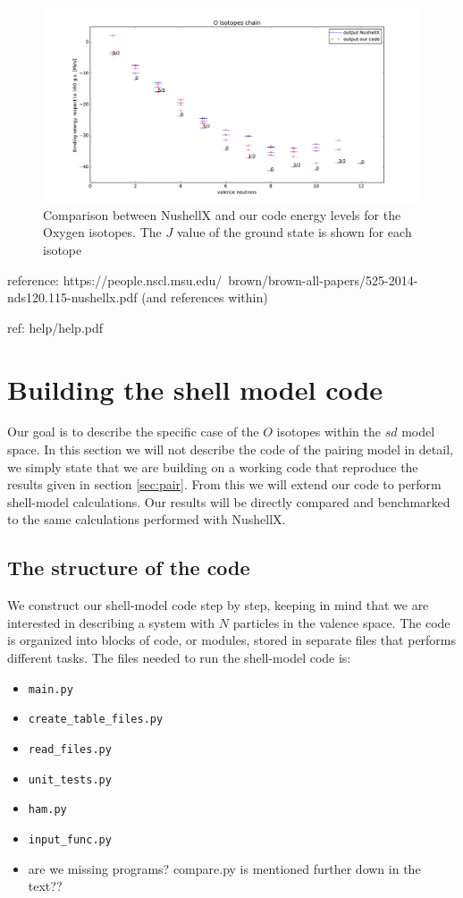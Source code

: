 \documentclass[twoside]{article}
\begin{document}
\begin{figure}[ht]
\centering
\includegraphics[width=1.\textwidth]{isotopes.pdf}
\caption{Comparison between NushellX and our code energy levels for the Oxygen isotopes. The $J$ value of the ground state is shown for each isotope}
\label{fig: isotopes}
\end{figure}

reference: https://people.nscl.msu.edu/~brown/brown-all-papers/525-2014-nds120.115-nushellx.pdf
(and references within)

ref: help/help.pdf




\section{Building the shell model code}

Our goal is to describe the specific case of the $O$ isotopes within the $sd$ model space. In this section we will not describe the code of the pairing model in detail, we simply state that we are building on a working code that reproduce the results given in section \ref{sec:pair}. From this we will extend our code to perform shell-model calculations. Our results will be directly compared and benchmarked to the same calculations performed with NushellX.

\subsection{The structure of the code}

We construct our shell-model code step by step, keeping in mind that we are interested in describing a system with $N$ particles in the valence space. The code is organized into blocks of code, or modules, stored in separate files that performs different tasks. The files needed to run the shell-model code is:
\begin{itemize}
\item \texttt{main.py}
\item \texttt{create\_table\_files.py}
\item \texttt{read\_files.py}
\item \texttt{unit\_tests.py} 
\item \texttt{ham.py} 
\item \texttt{input\_func.py}
\item are we missing programs? compare.py is mentioned further down in the text??
\end{itemize}
\smallskip
\end{document}
